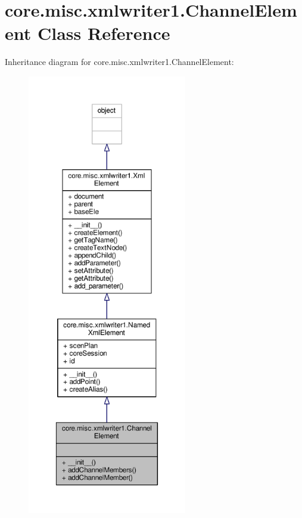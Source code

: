 \hypertarget{classcore_1_1misc_1_1xmlwriter1_1_1_channel_element}{\section{core.\+misc.\+xmlwriter1.\+Channel\+Element Class Reference}
\label{classcore_1_1misc_1_1xmlwriter1_1_1_channel_element}
}


Inheritance diagram for core.\+misc.\+xmlwriter1.\+Channel\+Element\+:
\nopagebreak
\begin{figure}[H]
\begin{center}
\leavevmode
\includegraphics[height=550pt]{classcore_1_1misc_1_1xmlwriter1_1_1_channel_element__inherit__graph}
\end{center}
\end{figure}


